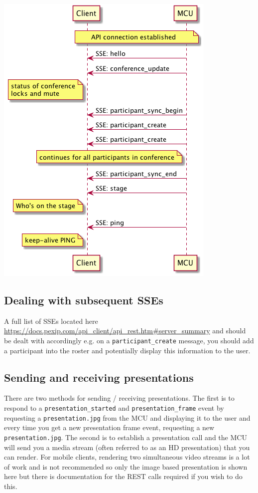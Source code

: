 \documentclass[a4paper,11pt]{article}
\begin{document}
\includegraphics[width=.9\linewidth]{images/initial_sse_sequence.png}

\subsection{Dealing with subsequent SSEs}
\label{sec:orgheadline12}

A full list of SSEs located here
\url{https://docs.pexip.com/api_client/api_rest.htm#server_summary} and
should be dealt with accordingly e.g. on a \texttt{participant\_create}
message, you should add a participant into the roster and potentially
display this information to the user.

\subsection{Sending and receiving presentations}
\label{sec:orgheadline15}

There are two methods for sending / receiving presentations.  The
first is to respond to a \texttt{presentation\_started} and
\texttt{presentation\_frame} event by requesting a \texttt{presentation.jpg} from the
MCU and displaying it to the user and every time you get a new
presentation frame event, requesting a new \texttt{presentation.jpg}.  The
second is to establish a presentation call and the MCU will send you a
media stream (often referred to as an HD presentation) that you can
render.  For mobile clients, rendering two simultaneous video streams
is a lot of work and is not recommended so only the image based
presentation is shown here but there is documentation for the REST
calls required if you wish to do this.
\end{document}
